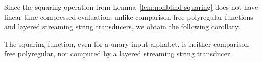 \documentclass{article}
\begin{document}
Since the squaring operation from Lemma~\ref{lem:nonblind-squaring} does not have linear time compressed evaluation, unlike comparison-free polyregular functions and layered streaming string transducers, we obtain the following corollary. 
\begin{corollary}
    The squaring function, even for a unary input alphabet, is neither comparison-free polyregular, nor computed by a layered streaming string transducer.
\end{corollary}


\nocite{bojanczyk_recobook}


\end{document}
